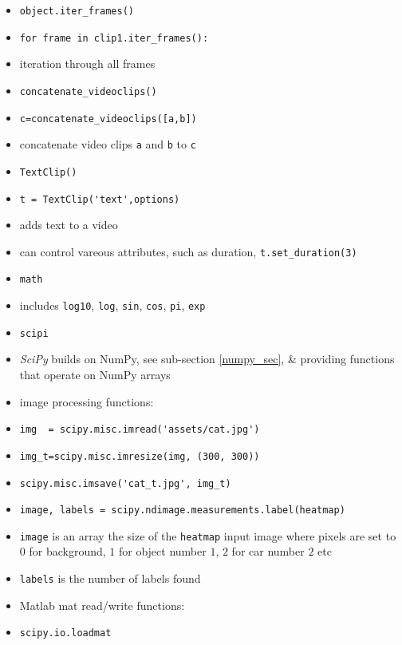\documentclass[onecolumn]{IEEEtran} %
\begin{document}
\begin{itemize}
        \ei
        \item \verb|object.iter_frames()|
        \bi
            \item \verb|for frame in clip1.iter_frames():|
            \item iteration through all frames
        \ei
        \item \verb|concatenate_videoclips()|
        \bi
            \item \verb|c=concatenate_videoclips([a,b])|
            \item concatenate video clips \verb|a| and \verb|b| to \verb|c|
        \ei
        \item \verb|TextClip()|
        \bi
            \item \verb|t = TextClip('text',options)|
            \item adds text to a video
            \item can control vareous attributes, such as duration, \newline
              \verb|t.set_duration(3)|
        \ei
    \ei
    \item \verb|math|
    \bi
        \item includes \verb|log10|, \verb|log|, \verb|sin|, \verb|cos|, \verb|pi|, \verb|exp|
    \ei
    \item \verb|scipi|
    \bi
        \item \emph{SciPy} builds on NumPy, see sub-section \ref{numpy_sec}, \& providing functions that operate on NumPy arrays
        \item image processing functions:
        \bi
            \item \verb|img  = scipy.misc.imread('assets/cat.jpg')|
            \item \verb|img_t=scipy.misc.imresize(img, (300, 300))|
            \item \verb|scipy.misc.imsave('cat_t.jpg', img_t)|
            \item \verb|image, labels = scipy.ndimage.measurements.label(heatmap)|
            \bi
                \item \verb|image| is an array the size of the \verb|heatmap| input image where pixels are set to $0$ for background, $1$ for object number $1$, $2$ for car number $2$ etc
                \item \verb|labels|  is the number of labels found
            \ei
        \ei
        \item Matlab mat read/write functions:
        \bi
            \item \verb|scipy.io.loadmat|

\end{itemize}
\end{document}
